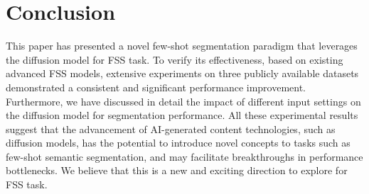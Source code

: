 \documentclass[sigconf]{acmart}
\begin{document}
\section{Conclusion}
This paper has presented a novel few-shot segmentation paradigm that leverages the diffusion model for FSS task. To verify its effectiveness, based on existing advanced FSS models, extensive experiments on three publicly available datasets demonstrated a consistent and significant performance improvement. Furthermore, we have discussed in detail the impact of different input settings on the diffusion model for segmentation performance. All these experimental results suggest that the advancement of AI-generated content technologies, such as diffusion models, has the potential to introduce novel concepts to tasks such as few-shot semantic segmentation, and may facilitate breakthroughs in performance bottlenecks. We believe that this is a new and exciting direction to explore for FSS task.



\end{document}

